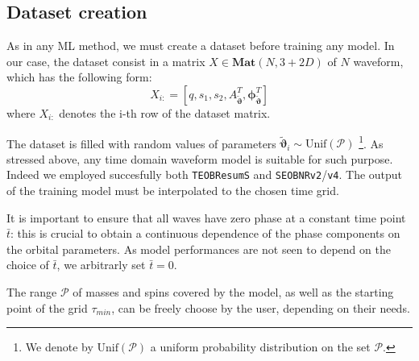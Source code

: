 \subsection{Dataset creation}
\label{sec:trainingset}
As in any ML method, we must create a dataset before training any model.
In our case, the dataset consist in a matrix ${X \in \mathbf{Mat}(N,3+2D)}$ of $N$ waveform, which has the following form:
\begin{equation} \label{eq:dataset}
	X_{i:} = [q,s_1,s_2, {A}_{{\tilde{\boldsymbol{\vartheta}}}}^T, \boldsymbol{\phi}_{{\tilde{\boldsymbol{\vartheta}}}}^T]
\end{equation}
where $X_{i:}$ denotes the i-th row of the dataset matrix.
\par
The dataset is filled with random values of parameters ${\tilde{\boldsymbol{\vartheta}}}_i \sim \textrm{Unif}(\mathcal{P})$
\footnote{We denote by $\textrm{Unif}(\mathcal{P})$ a uniform probability distribution on the set $\mathcal{P}$.}.
As stressed above, any time domain waveform model is suitable for such purpose. Indeed we employed succesfully both \texttt{TEOBResumS} and \texttt{SEOBNRv2}/\texttt{v4}.
The output of the training model must be interpolated to the chosen time grid.
\par
It is important to ensure that all waves have zero phase at a constant
time point $\bar{t}$: this is crucial to obtain a continuous
dependence of the phase components on the orbital parameters. As model
performances are not seen to depend on the choice of
$\bar{t}$, we arbitrarly set $\bar{t} = 0$.
\par
The range $\mathcal{P}$ of masses and spins covered by the model, as well as the starting point of the grid $\tau_{min}$, can be freely choose by the user, depending on their needs.


